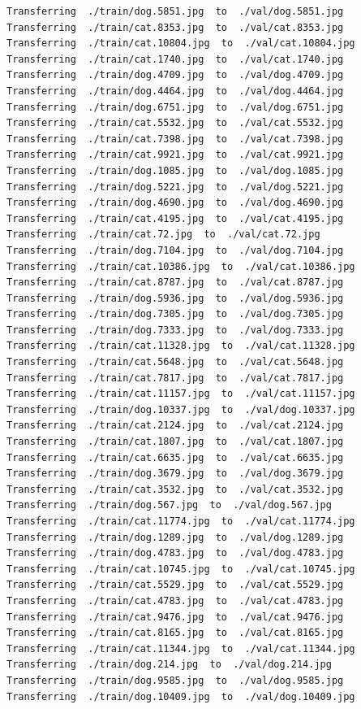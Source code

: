\documentclass[]{book}
\theoremstyle{definition}
\theoremstyle{definition}
\theoremstyle{definition}
\theoremstyle{remark}
\begin{document}
\begin{verbatim}
Transferring  ./train/dog.5851.jpg  to  ./val/dog.5851.jpg
Transferring  ./train/cat.8353.jpg  to  ./val/cat.8353.jpg
Transferring  ./train/cat.10804.jpg  to  ./val/cat.10804.jpg
Transferring  ./train/cat.1740.jpg  to  ./val/cat.1740.jpg
Transferring  ./train/dog.4709.jpg  to  ./val/dog.4709.jpg
Transferring  ./train/dog.4464.jpg  to  ./val/dog.4464.jpg
Transferring  ./train/dog.6751.jpg  to  ./val/dog.6751.jpg
Transferring  ./train/cat.5532.jpg  to  ./val/cat.5532.jpg
Transferring  ./train/cat.7398.jpg  to  ./val/cat.7398.jpg
Transferring  ./train/cat.9921.jpg  to  ./val/cat.9921.jpg
Transferring  ./train/dog.1085.jpg  to  ./val/dog.1085.jpg
Transferring  ./train/dog.5221.jpg  to  ./val/dog.5221.jpg
Transferring  ./train/dog.4690.jpg  to  ./val/dog.4690.jpg
Transferring  ./train/cat.4195.jpg  to  ./val/cat.4195.jpg
Transferring  ./train/cat.72.jpg  to  ./val/cat.72.jpg
Transferring  ./train/dog.7104.jpg  to  ./val/dog.7104.jpg
Transferring  ./train/cat.10386.jpg  to  ./val/cat.10386.jpg
Transferring  ./train/cat.8787.jpg  to  ./val/cat.8787.jpg
Transferring  ./train/dog.5936.jpg  to  ./val/dog.5936.jpg
Transferring  ./train/dog.7305.jpg  to  ./val/dog.7305.jpg
Transferring  ./train/dog.7333.jpg  to  ./val/dog.7333.jpg
Transferring  ./train/cat.11328.jpg  to  ./val/cat.11328.jpg
Transferring  ./train/cat.5648.jpg  to  ./val/cat.5648.jpg
Transferring  ./train/cat.7817.jpg  to  ./val/cat.7817.jpg
Transferring  ./train/cat.11157.jpg  to  ./val/cat.11157.jpg
Transferring  ./train/dog.10337.jpg  to  ./val/dog.10337.jpg
Transferring  ./train/cat.2124.jpg  to  ./val/cat.2124.jpg
Transferring  ./train/cat.1807.jpg  to  ./val/cat.1807.jpg
Transferring  ./train/cat.6635.jpg  to  ./val/cat.6635.jpg
Transferring  ./train/dog.3679.jpg  to  ./val/dog.3679.jpg
Transferring  ./train/cat.3532.jpg  to  ./val/cat.3532.jpg
Transferring  ./train/dog.567.jpg  to  ./val/dog.567.jpg
Transferring  ./train/cat.11774.jpg  to  ./val/cat.11774.jpg
Transferring  ./train/dog.1289.jpg  to  ./val/dog.1289.jpg
Transferring  ./train/dog.4783.jpg  to  ./val/dog.4783.jpg
Transferring  ./train/cat.10745.jpg  to  ./val/cat.10745.jpg
Transferring  ./train/cat.5529.jpg  to  ./val/cat.5529.jpg
Transferring  ./train/cat.4783.jpg  to  ./val/cat.4783.jpg
Transferring  ./train/cat.9476.jpg  to  ./val/cat.9476.jpg
Transferring  ./train/cat.8165.jpg  to  ./val/cat.8165.jpg
Transferring  ./train/cat.11344.jpg  to  ./val/cat.11344.jpg
Transferring  ./train/dog.214.jpg  to  ./val/dog.214.jpg
Transferring  ./train/dog.9585.jpg  to  ./val/dog.9585.jpg
Transferring  ./train/dog.10409.jpg  to  ./val/dog.10409.jpg

\end{verbatim}
\end{document}
